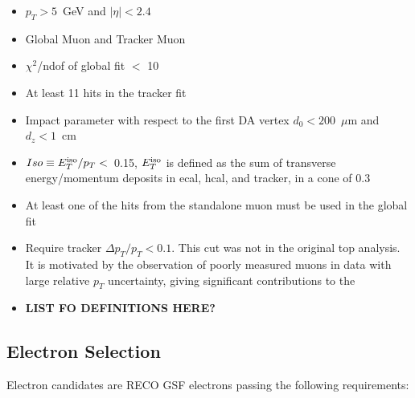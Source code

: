 \begin{itemize}

\item $p_{T} > 5$~GeV and $|\eta| < 2.4$

\item Global Muon and Tracker Muon

\item $\chi^2$/ndof of global fit $<$ 10

\item At least 11 hits in the tracker fit

\item Impact parameter with respect to the first DA vertex $d_{0} < 200$~$\mu$m and $d_{z} < 1$~cm

\item $Iso \equiv E_T^{\rm iso}/p_T < $~0.15, $E_T^{\rm iso}$ is defined as the sum of 
transverse energy/momentum deposits in ecal, hcal, and tracker, in a cone of 0.3

\item At least one of the hits from the 
standalone muon must be used in the global fit

\item Require tracker $\Delta p_T/p_T < 0.1$. This cut was not in the original top analysis.
It is motivated by the observation of poorly measured muons in data with large
relative $p_T$ uncertainty, giving significant contributions to the \met

\item {\color{red} \bf LIST FO DEFINITIONS HERE? }

\end{itemize}



\subsection{Electron Selection}
\label{sec:electron}

Electron candidates are RECO GSF electrons passing the following requirements:

